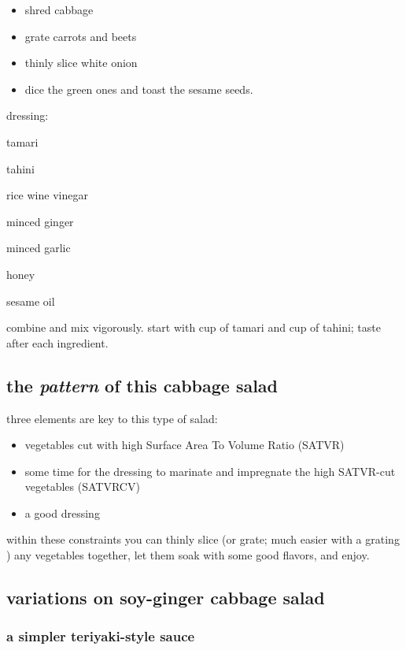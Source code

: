 \begin{itemize}
  \item shred cabbage
  \item grate carrots and beets
  \item thinly slice white onion
  \item dice the green ones and toast the sesame seeds.
\end{itemize}
	
dressing:
\begin{ingredients}
  \item tamari
  \item tahini
  \item rice wine vinegar
  \item minced ginger
  \item minced garlic
  \item honey
  \item sesame oil
\end{ingredients}

combine and mix vigorously. start with \onethird cup of tamari and \onequarter 
cup of tahini; taste after each ingredient.

\subsection{the \textit{pattern} of this cabbage salad}

three elements are key to this type of salad:

\begin{itemize}
  \item vegetables cut with high Surface Area To Volume Ratio (SATVR)
  \item some time for the dressing to marinate and impregnate the high 
  SATVR-cut vegetables (SATVRCV)
  \item a good dressing
\end{itemize}

within these constraints you can thinly slice (or grate; much easier with a 
grating ) any vegetables together, let them soak with some good flavors, 
and enjoy.

\subsection{variations on soy-ginger cabbage salad}

\subsubsection{a simpler teriyaki-style sauce}

